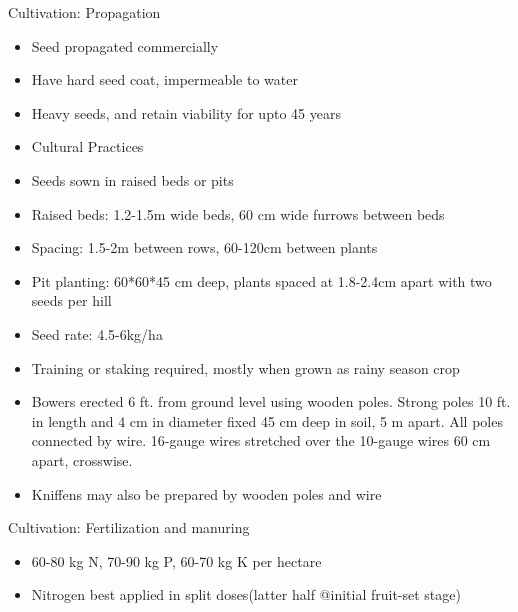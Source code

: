 \documentclass[
  ignorenonframetext,
  aspectratio=169]{beamer}
\providecommand{\tightlist}{%
  \setlength{\itemsep}{0pt}\setlength{\parskip}{0pt}}
\begin{document}
\begin{frame}{Cultivation: Propagation}
\protect\hypertarget{cultivation-propagation-1}{}
\begin{itemize}
\tightlist
\item
  Seed propagated commercially
\item
  Have hard seed coat, impermeable to water
\item
  Heavy seeds, and retain viability for upto 45 years
\item
  Cultural Practices
\item
  Seeds sown in raised beds or pits
\item
  Raised beds: 1.2-1.5m wide beds, 60 cm wide furrows between beds
\item
  Spacing: 1.5-2m between rows, 60-120cm between plants
\end{itemize}
\end{frame}

\begin{frame}{}
\protect\hypertarget{section-1}{}
\begin{itemize}
\tightlist
\item
  Pit planting: 60*60*45 cm deep, plants spaced at 1.8-2.4cm apart with
  two seeds per hill
\item
  Seed rate: 4.5-6kg/ha
\item
  Training or staking required, mostly when grown as rainy season crop
\item
  Bowers erected 6 ft. from ground level using wooden poles. Strong
  poles 10 ft. in length and 4 cm in diameter fixed 45 cm deep in soil,
  5 m apart. All poles connected by wire. 16-gauge wires stretched over
  the 10-gauge wires 60 cm apart, crosswise.
\item
  Kniffens may also be prepared by wooden poles and wire
\end{itemize}
\end{frame}

\begin{frame}{Cultivation: Fertilization and manuring}
\protect\hypertarget{cultivation-fertilization-and-manuring}{}
\begin{itemize}
\tightlist
\item
  60-80 kg N, 70-90 kg P, 60-70 kg K per hectare
\item
  Nitrogen best applied in split doses(latter half @initial fruit-set
  stage)
\end{itemize}
\end{frame}
\end{document}
